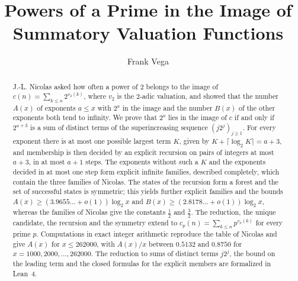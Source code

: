 \documentclass[11pt]{amsart}
\title{Powers of a Prime in the Image of Summatory Valuation Functions}
\author{Frank Vega}
\theoremstyle{definition}
\begin{document}
\begin{abstract}
J.-L. Nicolas asked how often a power of $2$ belongs to the image of $c(n)=\sum_{k\le n}2^{v_2(k)}$, where $v_2$ is the $2$-adic valuation, and showed that the number $A(x)$ of exponents $a\le x$ with $2^a$ in the image and the number $B(x)$ of the other exponents both tend to infinity. We prove that $2^a$ lies in the image of $c$ if and only if $2^{a+3}$ is a sum of distinct terms of the superincreasing sequence $(j2^j)_{j\ge1}$. For every exponent there is at most one possible largest term $K$, given by $K+\lceil\log_2K\rceil=a+3$, and membership is then decided by an explicit recursion on pairs of integers at most $a+3$, in at most $a+1$ steps. The exponents without such a $K$ and the exponents decided in at most one step form explicit infinite families, described completely, which contain the three families of Nicolas. The states of the recursion form a forest and the set of successful states is symmetric; this yields further explicit families and the bounds $A(x)\ge(3.9655\ldots+o(1))\log_2x$ and $B(x)\ge(2.8178\ldots+o(1))\log_2x$, whereas the families of Nicolas give the constants $\frac12$ and $\frac32$. The reduction, the unique candidate, the recursion and the symmetry extend to $c_p(n)=\sum_{k\le n}p^{v_p(k)}$ for every prime $p$. Computations in exact integer arithmetic reproduce the table of Nicolas and give $A(x)$ for $x\le262000$, with $A(x)/x$ between $0.5132$ and $0.8750$ for $x=1000,2000,\dots,262000$. The reduction to sums of distinct terms $j2^j$, the bound on the leading term and the closed formulas for the explicit members are formalized in Lean~4.
\end{abstract}

\maketitle
\end{document}
